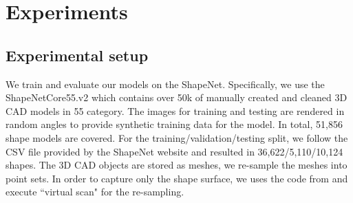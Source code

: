 \section{Experiments}
\subsection{Experimental setup}
We train and evaluate our models on the ShapeNet\citep{shapenetdata}. Specifically, we use the ShapeNetCore55.v2 which contains over 50k of
manually created and cleaned 3D CAD models in 55 category.
The images for training
and testing are rendered in random angles to provide synthetic training data for the model. In total,
51,856 shape models are covered. For the training/validation/testing split, we follow the CSV file provided by the ShapeNet website and resulted in 36,622/5,110/10,124 shapes. The 3D CAD objects are
stored as meshes, we re-sample the meshes into point sets. In order to capture only the shape surface, we uses the code from \citep{Wang-2017-OCNN} and execute ``virtual scan" for the re-sampling.
